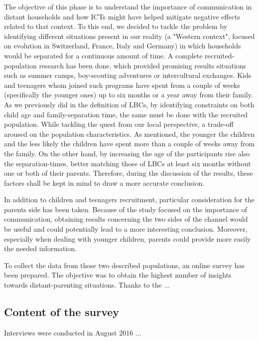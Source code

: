 The objective of this phase is to understand the importance of communication in distant households and how ICTs might have helped mitigate negative effects related to that context. To this end, we decided to tackle the problem by identifying different situations present in our reality (a "Western context", focused on evolution in Switzerland, France, Italy and Germany) in which households would be separated for a continuous amount of time. A complete recruited-population research has been done, which provided promising results situations such as summer camps, boy-scouting adventures or intercultural exchanges. Kids and teenagers whom joined such programs have spent from a couple of weeks (specifically the younger ones) up to six months or a year away from their family. As we previously did in the definition of LBCs, by identifying constraints on both child age and family-separation time, the same must be done with the recruited population. While tackling the quest from our local perspective, a trade-off aroused on the population characteristics. As mentioned, the younger the children and the less likely the children have spent more than a couple of weeks away from the family. On the other hand, by increasing the age of the participants rise also the separation-times, better matching those of LBCs at least six months without one or both of their parents. Therefore, during the discussion of the results, these factors shall be kept in mind to draw a more accurate conclusion.

In addition to children and teenagers recruitment, particular consideration for the parents side has been taken. Because of the study focused on the importance of communication, obtaining results concerning the two sides of the channel would be useful and could potentially lead to a more interesting conclusion. Moreover, especially when dealing with younger children, parents could provide more easily the needed information. 

To collect the data from those two described populations, an online survey has been prepared. The objective was to obtain the highest number of insights towards distant-parenting situations. Thanks to the ...

\subsection{Content of the survey}
\label{content-survey}
Interviews were conducted in August 2016 ...